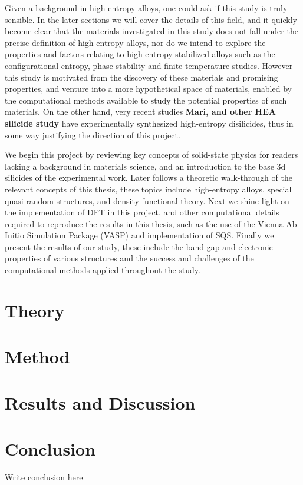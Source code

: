 \documentclass[UKenglish]{ifimaster}  %
\begin{document}
 
Given a background in high-entropy alloys, one could ask if this study is truly sensible. In the later sections we will cover the details of this field, and it quickly become clear that the materials investigated in this study does not fall under the precise definition of high-entropy alloys, nor do we intend to explore the properties and factors relating to high-entropy stabilized alloys such as the configurational entropy, phase stability and finite temperature studies. However this study is motivated from the discovery of these materials and promising properties, and venture into a more hypothetical space of materials, enabled by the computational methods available to study the potential properties of such materials. On the other hand, very recent studies \textbf{Mari, and other HEA silicide study} have experimentally synthesized high-entropy disilicides, thus in some way justifying the direction of this project. 

We begin this project by reviewing key concepts of solid-state physics for readers lacking a background in materials science, and an introduction to the base 3d silicides of the experimental work. Later follows a theoretic walk-through of the relevant concepts of this thesis, these topics include high-entropy alloys, special quasi-random structures, and density functional theory. Next we shine light on the implementation of DFT in this project, and other computational details required to reproduce the results in this thesis, such as the use of the Vienna Ab Initio Simulation Package (VASP) and implementation of SQS. Finally we present the results of our study, these include the band gap and electronic properties of various structures and the success and challenges of the computational methods applied throughout the study. 

\part{Theory}                    %




\part{Method}


 
\part{Results and Discussion}




\part{Conclusion}
Write conclusion here

\appendix



\backmatter{}
\printbibliography
\end{document}
